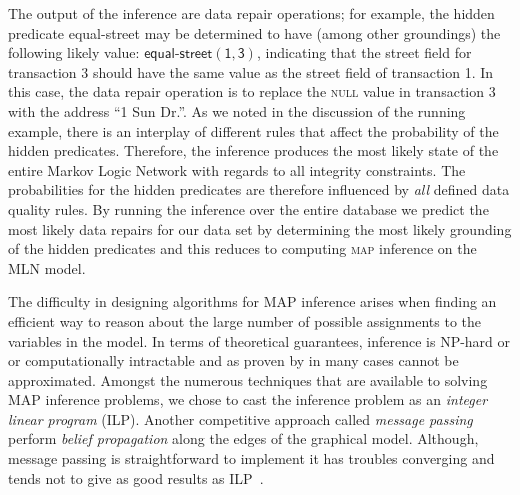 The output of the inference are data repair operations; for example, the hidden predicate \textsf{equal-street} may be determined to have (among other groundings) the following likely value: $\mathsf{\textsf{equal-street}(1, 3)}$, indicating that the \textsf{street} field for transaction 3 should have the same value as the \textsf{street} field of transaction 1. In this case, the data repair operation is to replace the \textsc{null} value in transaction 3 with the address ``1 Sun Dr.''. 
As we noted in the discussion of the running example, there is an interplay of different rules that affect the probability of the hidden predicates. Therefore, the inference produces the most likely state of the entire Markov Logic Network with regards to all integrity constraints. The probabilities for the hidden predicates are therefore influenced by \textit{all} defined data quality rules. By running the inference over the entire database we predict the most likely data repairs for our data set by determining the most likely grounding of the hidden predicates and this reduces to computing \textsc{map} inference on the MLN model.      

The difficulty in designing algorithms for MAP inference arises when finding an efficient way to reason about the large number of possible assignments to the variables in the model. In terms of theoretical guarantees, inference is NP-hard or or computationally intractable and as proven by \cite{Shimony1994} in many cases cannot be approximated. Amongst the numerous techniques that are available to solving MAP inference problems, we chose to cast the inference problem as an \emph{integer linear program} (ILP)\cite{Sontag10approximateinference}. Another competitive approach called \emph{message passing} perform \emph{belief propagation} along the edges of the graphical model. Although, message passing is straightforward to implement it has troubles converging \cite{schwing2011distributed, felzenszwalb2006efficient, pritch2009shift} and tends not to give as good results as ILP~\cite{NoessnerNS13}. 

